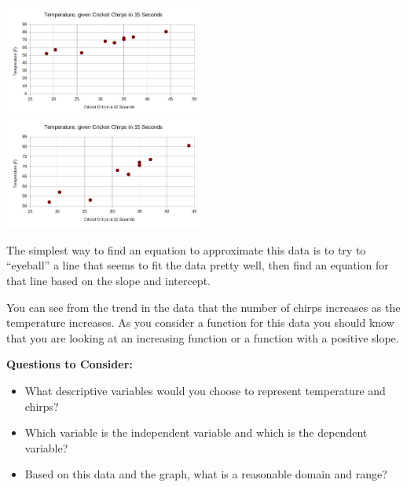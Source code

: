 \begin{example}
\begin{solution}
    \begin{center}
    \includegraphics[width = 0.49\textwidth]{img/chap1/sec1-4/1-4-crickets-plot1.jpg}~
    \includegraphics[width = 0.49\textwidth]{img/chap1/sec1-4/1-4-crickets-plot2.jpg}
    \end{center}

\end{solution}\end{example}

The simplest way to find an equation to approximate this data is to try to ``eyeball'' a line that seems to fit the data pretty well, then find an equation for that line based on the slope and intercept.

You can see from the trend in the data that the number of chirps increases as the temperature increases. As you consider a function for this data you should know that you are looking at an increasing function or a function with a positive slope.

{\bf Questions to Consider:}
  \begin{itemize}
    \item What descriptive variables would you choose to represent temperature and chirps?
    \item Which variable is the independent variable and which is the dependent variable?
    \item Based on this data and the graph, what is a reasonable domain and range?
  \end{itemize}

